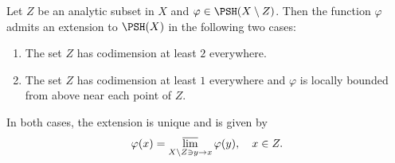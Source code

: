 \begin{theorem}\label{thm:GRexten}
    Let $Z$ be an analytic subset in $X$ and $\varphi\in \PSH(X\setminus Z)$. Then the function $\varphi$ admits an extension to $\PSH(X)$ in the following two cases:
    \begin{enumerate}
        \item\label{itm:thm:GRexten:1} The set $Z$ has codimension at least $2$ everywhere.
        \item\label{itm:thm:GRexten:2} The set $Z$ has codimension at least $1$ everywhere and $\varphi$ is locally bounded from above near each point of $Z$.
    \end{enumerate}
    In both cases, the extension is unique and is given by
    \begin{equation}\label{eq:GRextvarphiexp}
    \varphi(x)=\varlimsup_{X\setminus Z\ni y\to x}\varphi(y),\quad x\in Z.
    \end{equation}
\end{theorem}
